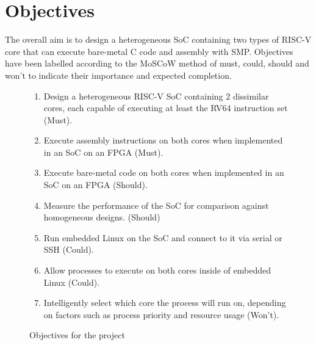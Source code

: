 \section{Objectives}
The overall aim is to design a heterogeneous SoC containing two types of RISC-V core that can execute bare-metal C code and assembly with SMP. Objectives have been labelled according to the MoSCoW method\cite{case-method-fasttrack} of must, could, should and won't to indicate their importance and expected completion.
\begin{figure}[h!]
    \centering
    \begin{enumerate}
        \item Design a heterogeneous RISC-V SoC containing 2 dissimilar cores, each capable of executing at least the RV64 instruction set (Must).
        \item Execute assembly instructions on both cores when implemented in an SoC on an FPGA (Must).
        \item Execute bare-metal code on both cores when implemented in an SoC on an FPGA (Should).
        \item Measure the performance of the SoC for comparison against homogeneous designs. (Should)
        \item Run embedded Linux on the SoC and connect to it via serial or SSH (Could).
        \item Allow processes to execute on both cores inside of embedded Linux (Could).
        \item Intelligently select which core the process will run on, depending on factors such as process priority and resource usage (Won't).
    \end{enumerate}
    \caption{Objectives for the project}
    \label{fig:objectives}
\end{figure}